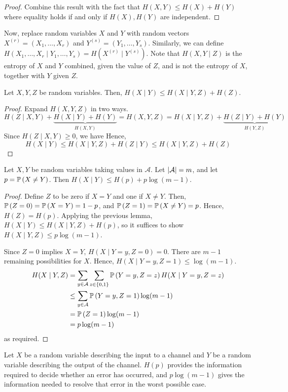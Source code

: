 \begin{proof}
    Combine this result with the fact that \( H(X,Y) \leq H(X) + H(Y) \) where equality holds if and only if \( H(X), H(Y) \) are independent.
\end{proof}
Now, replace random variables \( X \) and \( Y \) with random vectors \( X^{(r)} = (X_1, \dots, X_r) \) and \( Y^{(s)} = (Y_1, \dots, Y_s) \).
Similarly, we can define \( H(X_1, \dots, X_r \mid Y_1, \dots, Y_s) = H(X^{(r)} \mid Y^{(s)}) \).
Note that \( H(X,Y\mid Z) \) is the entropy of \( X \) and \( Y \) combined, given the value of \( Z \), and is not the entropy of \( X \), together with \( Y \) given \( Z \).
\begin{lemma}
    Let \( X, Y, Z \) be random variables.
    Then, \( H(X \mid Y) \leq H(X \mid Y, Z) + H(Z) \).
\end{lemma}
\begin{proof}
    Expand \( H(X,Y,Z) \) in two ways.
    \[ H(Z \mid X,Y) + \underbrace{H(X\mid Y) + H(Y)}_{H(X,Y)} = H(X,Y,Z) = H(X \mid Y,Z) + \underbrace{H(Z \mid Y) + H(Y)}_{H(Y,Z)} \]
    Since \( H(Z \mid X,Y) \geq 0 \), we have
    Hence,
    \[ H(X \mid Y) \leq H(X \mid Y,Z) + H(Z \mid Y) \leq H(X \mid Y,Z) + H(Z) \]
\end{proof}
\begin{proposition}
    Let \( X, Y \) be random variables taking values in \( \mathcal A \).
    Let \( \abs{\mathcal A} = m \), and let \( p = \mathbb{P}\left({X \neq Y}\right) \).
    Then \( H(X \mid Y) \leq H(p) + p \log(m-1) \).
\end{proposition}
\begin{proof}
    Define \( Z \) to be zero if \( X = Y \) and one if \( X \neq Y \).
    Then, \( \mathbb{P}\left({Z = 0}\right) = \mathbb{P}\left({X = Y}\right) = 1 - p \), and \( \mathbb{P}\left({Z = 1}\right) = \mathbb{P}\left({X \neq Y}\right) = p \).
    Hence, \( H(Z) = H(p) \).
    Applying the previous lemma, \( H(X \mid Y) \leq H(X \mid Y, Z) + H(p) \), so it suffices to show \( H(X \mid Y, Z) \leq p\log(m-1) \).

    Since \( Z = 0 \) implies \( X = Y \), \( H(X \mid Y = y, Z = 0) = 0 \).
    There are \( m - 1 \) remaining possibilities for \( X \).
    Hence, \( H(X \mid Y = y, Z = 1) \leq \log(m-1) \).
    \begin{align*}
        H(X \mid Y, Z) &= \sum_{y \in \mathcal A} \sum_{z \in \qty{0,1}} \mathbb{P}\left({Y = y, Z = z}\right) H(X \mid Y = y, Z = z) \\
        &\leq \sum_{y \in \mathcal A} \mathbb{P}\left({Y = y, Z = 1}\right) \log(m-1) \\
        &= \mathbb{P}\left({Z = 1}\right) \log (m-1) \\
        &= p\log(m-1)
    \end{align*}
    as required.
\end{proof}
Let \( X \) be a random variable describing the input to a channel and \( Y \) be a random variable describing the output of the channel.
\( H(p) \) provides the information required to decide whether an error has occurred, and \( p\log(m-1) \) gives the information needed to resolve that error in the worst possible case.

